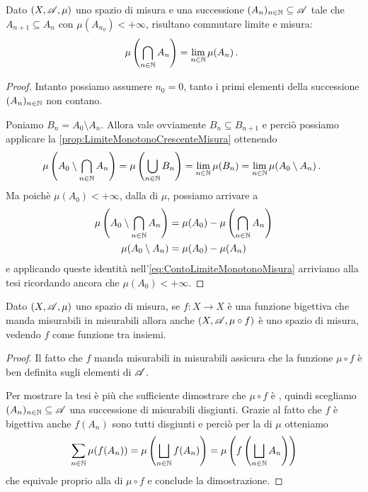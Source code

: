 \begin{corollary}\label{cor:LimiteMonotonoDecrescenteMisura}
	Dato $(X,\mathscr A,\mu)$ uno spazio di misura e una successione $(A_n)_{n\in\mathbb N}\subseteq \mathscr A$ tale che $A_{n+1}\subseteq A_n$ con $\mu(A_{n_0})<+\infty$, risultano commutare limite e misura:
	\begin{equation*}
		\mu\left(\bigcap_{n\in\mathbb N} A_n\right)=\lim_{n\in\mathbb N} \mu(A_n) \, \text{. }
	\end{equation*}
\end{corollary}
\begin{proof}
	Intanto possiamo assumere $n_0=0$, tanto i primi elementi della successione $(A_n)_{n\in\mathbb N}$ non contano.
	
	Poniamo $B_n=A_0\setminus A_n$. 
	Allora vale ovviamente $B_n\subseteq B_{n+1}$ e perciò possiamo applicare la \cref{prop:LimiteMonotonoCrescenteMisura} ottenendo
	\begin{equation}\label{eq:ContoLimiteMonotonoMisura}
		\mu\left(A_0\setminus\bigcap_{n\in\mathbb N}A_n\right)=\mu\left(\bigcup_{n\in\mathbb N}B_n\right)=\lim_{n\in\mathbb N}\mu(B_n)
		=\lim_{n\in\mathbb N}\mu(A_0\setminus A_n) \, \text{. }
	\end{equation}
	Ma poichè $\mu(A_0)<+\infty$, dalla \sigadd[ità] di $\mu$, possiamo arrivare a
	\begin{align*}
		\mu\left(A_0\setminus\bigcap_{n\in\mathbb N}A_n\right)&=\mu(A_0)-\mu\left(\bigcap_{n\in\mathbb N}A_n\right)\\
		\mu(A_0\setminus A_n)&=\mu(A_0)-\mu(A_n)
	\end{align*}
	e applicando queste identità nell'\cref{eq:ContoLimiteMonotonoMisura} arriviamo alla tesi ricordando ancora che $\mu(A_0)<+\infty$.
\end{proof}

\begin{proposition}\label{prop:BigettivaInduceMisura}
	Dato $(X,\mathscr A,\mu)$ uno spazio di misura, se $f:X\to X$ è una funzione bigettiva che manda misurabili in misurabili allora anche $(X,\mathscr A,\mu\circ f)$ è uno spazio di misura, vedendo $f$ come funzione tra insiemi.
\end{proposition}
\begin{proof}
	Il fatto che $f$ manda misurabili in misurabili assicura che la funzione $\mu\circ f$ è ben definita sugli elementi di $\mathscr A$.
	
	Per mostrare la tesi è più che sufficiente dimostrare che $\mu\circ f$ è \sigadd{}, quindi scegliamo $(A_n)_{n\in\mathbb N}\subseteq\mathscr A$ una successione di misurabili disgiunti.
	Grazie al fatto che $f$ è bigettiva anche $f(A_n)$ sono tutti disgiunti e perciò per la \sigadd[ità] di $\mu$ otteniamo
	\begin{equation*}
		\sum_{n\in\mathbb N}\mu(f(A_n))=\mu\left(\bigsqcup_{n\in\mathbb N}f(A_n)\right)=\mu\left(f\left(\bigsqcup_{n\in\mathbb N}A_n\right)\right)
	\end{equation*}
	che equivale proprio alla \sigadd[ità] di $\mu\circ f$ e conclude la dimostrazione.
\end{proof}




